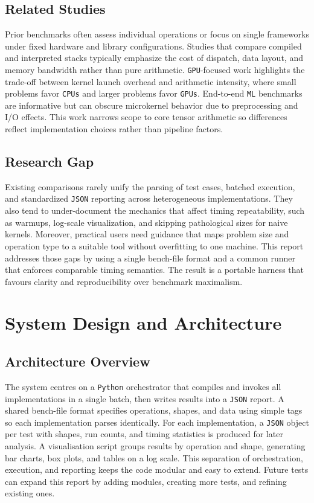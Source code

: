 \documentclass[a4paper,12pt]{article}
\begin{document}
\subsection{Related Studies}
Prior benchmarks often assess individual operations or focus on single frameworks under fixed hardware and library configurations. Studies that compare compiled and interpreted stacks typically emphasize the cost of dispatch, data layout, and memory bandwidth rather than pure arithmetic. \texttt{GPU}-focused work highlights the trade-off between kernel launch overhead and arithmetic intensity, where small problems favor \texttt{CPUs} and larger problems favor \texttt{GPUs}. End-to-end \texttt{ML} benchmarks are informative but can obscure microkernel behavior due to preprocessing and I/O effects. This work narrows scope to core tensor arithmetic so differences reflect implementation choices rather than pipeline factors.

\subsection{Research Gap}
Existing comparisons rarely unify the parsing of test cases, batched execution, and standardized \texttt{JSON} reporting across heterogeneous implementations. They also tend to under-document the mechanics that affect timing repeatability, such as warmups, log-scale visualization, and skipping pathological sizes for naive kernels. Moreover, practical users need guidance that maps problem size and operation type to a suitable tool without overfitting to one machine. This report addresses those gaps by using a single bench-file format and a common runner that enforces comparable timing semantics. The result is a portable harness that favours clarity and reproducibility over benchmark maximalism.

\section{System Design and Architecture}
\subsection{Architecture Overview}
The system centres on a \texttt{Python} orchestrator that compiles and invokes all implementations in a single batch, then writes results into a \texttt{JSON} report. A shared bench-file format specifies operations, shapes, and data using simple tags so each implementation parses identically. For each implementation, a \texttt{JSON} object per test with shapes, run counts, and timing statistics is produced for later analysis. A visualisation script groups results by operation and shape, generating bar charts, box plots, and tables on a log scale. This separation of orchestration, execution, and reporting keeps the code modular and easy to extend. Future tests can expand this report by adding modules, creating more tests, and refining existing ones.
\end{document}
